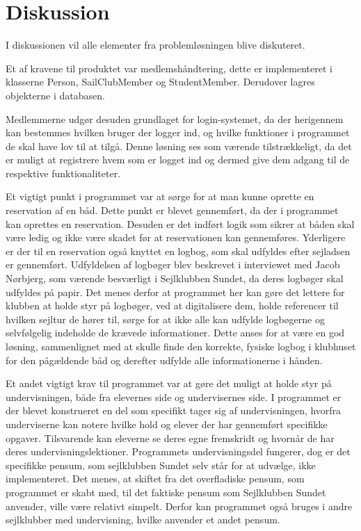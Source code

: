 \chapter{Diskussion}

I diskussionen vil alle elementer fra problemløsningen blive diskuteret.

Et af kravene til produktet var medlemshåndtering, dette er implementeret i klasserne Person, SailClubMember og StudentMember. 
Derudover lagres objekterne i databasen. 

Medlemmerne udgør desuden grundlaget for login-systemet, da der herigennem kan bestemmes hvilken bruger der logger ind, og hvilke funktioner i programmet de skal have lov til at tilgå.  
Denne løsning ses som værende tilstrækkeligt, da det er muligt at registrere hvem som er logget ind og dermed give dem adgang til de respektive funktionaliteter. 

Et vigtigt punkt i programmet var at sørge for at man kunne oprette en reservation af en båd. 
Dette punkt er blevet gennemført, da der i programmet kan oprettes en reservation. 
Desuden er det indført logik som sikrer at båden skal være ledig og ikke være skadet før at reservationen kan gennemføres. 
Yderligere er der til en reservation også knyttet en logbog, som skal udfyldes efter sejladsen er gennemført. 
Udfyldelsen af logbøger blev beskrevet i interviewet med Jacob Nørbjerg, som værende besværligt i Sejlklubben Sundet, da deres logbøger skal udfyldes på papir. 
Det menes derfor at programmet her kan gøre det lettere for klubben at holde styr på logbøger, ved at digitalisere dem, holde referencer til hvilken sejltur de hører til, sørge for at ikke alle kan udfylde logbøgerne og selvfølgelig indeholde de krævede informationer. 
Dette anses for at være en god løsning, sammenlignet med at skulle finde den korrekte, fysiske logbog i klubhuset for den pågældende båd og derefter udfylde alle informationerne i hånden. 

Et andet vigtigt krav til programmet var at gøre det muligt at holde styr på undervisningen, både fra elevernes side og undervisernes side. 
I programmet er der blevet konstrueret en del som specifikt tager sig af undervisningen, hvorfra underviserne kan notere hvilke hold og elever der har gennemført specifikke opgaver.
Tilsvarende kan eleverne se deres egne fremskridt og hvornår de har deres undervisningslektioner.
Programmets undervisningsdel fungerer, dog er det specifikke pensum, som sejlklubben Sundet selv står for at udvælge, ikke implementeret. 
Det menes, at skiftet fra det overfladiske pensum, som programmet er skabt med, til det faktiske pensum som Sejlklubben Sundet anvender, ville være relativt simpelt. 
Derfor kan programmet også bruges i andre sejlklubber med undervisning, hvilke anvender et andet pensum.

